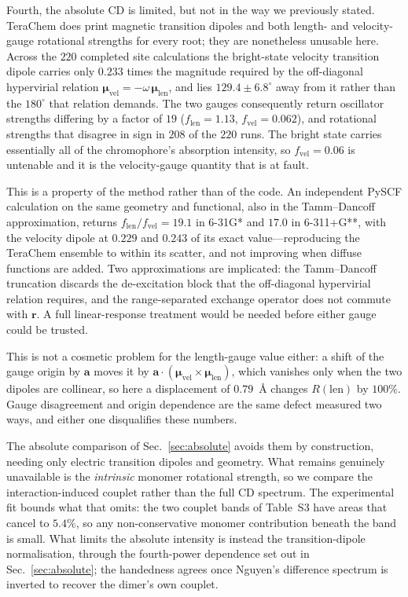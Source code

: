 \documentclass[journal=jpcbfk, manuscript=article, layout=twocolumn, doi=true]{achemso}
\begin{document}
Fourth, the absolute CD is limited, but not in the way we previously stated.
TeraChem does print magnetic transition dipoles and both length- and
velocity-gauge rotational strengths for every root; they are nonetheless
unusable here. Across the $220$ completed site calculations the bright-state
velocity transition dipole carries only $0.233$ times the magnitude required by
the off-diagonal hypervirial relation
$\bm\mu_{\mathrm{vel}} = -\omega\,\bm\mu_{\mathrm{len}}$, and lies
$129.4\pm6.8^{\circ}$ away from it rather than the $180^{\circ}$ that relation
demands. The two gauges consequently return oscillator strengths differing by a
factor of $19$ ($f_{\mathrm{len}} = 1.13$, $f_{\mathrm{vel}} = 0.062$), and
rotational strengths that disagree in sign in $208$ of the $220$ runs. The
bright state carries essentially all of the chromophore's absorption intensity,
so $f_{\mathrm{vel}} = 0.06$ is untenable and it is the velocity-gauge quantity
that is at fault.

This is a property of the method rather than of the code. An independent PySCF
calculation on the same geometry and functional, also in the Tamm--Dancoff
approximation, returns $f_{\mathrm{len}}/f_{\mathrm{vel}} = 19.1$ in 6-31G* and
$17.0$ in 6-311+G**, with the velocity dipole at $0.229$ and $0.243$ of its
exact value---reproducing the TeraChem ensemble to within its scatter, and not
improving when diffuse functions are added. Two approximations are implicated:
the Tamm--Dancoff truncation discards the de-excitation block that the
off-diagonal hypervirial relation requires, and the range-separated exchange
operator does not commute with $\mathbf{r}$. A full linear-response treatment
would be needed before either gauge could be trusted.

This is not a cosmetic problem for the length-gauge value
either: a shift of the gauge origin by $\mathbf{a}$ moves it by
$\mathbf{a}\cdot(\bm\mu_{\mathrm{vel}}\times\bm\mu_{\mathrm{len}})$, which
vanishes only when the two dipoles are collinear, so here a displacement of
$0.79$~\AA{} changes $R(\mathrm{len})$ by $100\%$. Gauge disagreement and
origin dependence are the same defect measured two ways, and either one
disqualifies these numbers.

The absolute comparison of Sec.~\ref{sec:absolute} avoids them by construction,
needing only electric transition dipoles and geometry. What remains genuinely
unavailable is the \emph{intrinsic} monomer rotational strength, so we compare
the interaction-induced couplet rather than the full CD spectrum. The
experimental fit bounds what that omits: the two couplet bands of Table~S3 have
areas that cancel to $5.4\%$, so any non-conservative monomer contribution
beneath the band is small. What limits the absolute intensity is instead the
transition-dipole normalisation, through the fourth-power dependence set out in
Sec.~\ref{sec:absolute}; the handedness agrees once Nguyen's difference
spectrum is inverted to recover the dimer's own couplet.
\end{document}
